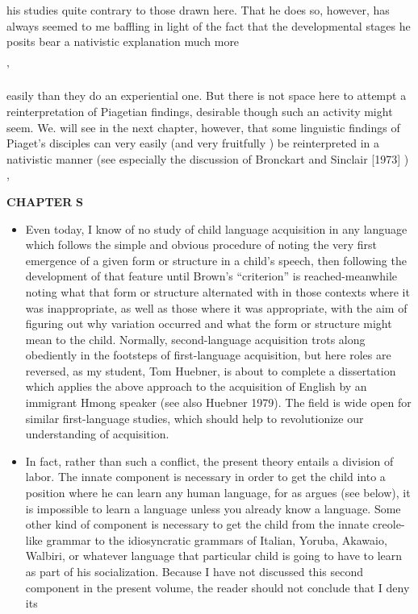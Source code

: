 his studies quite contrary to those drawn here. That he does so, how\-ever, has always seemed to me baffling in light of the fact that the developmental stages he posits bear a nativistic explanation much more

'


easily than they do an experiential one. But there is not space here to attempt a reinterpretation of Piagetian findings, desirable though such an activity might seem. We. will see in the next chapter, however, that some linguistic findings of Piaget's disciples can very easily (and very fruitfully ) be reinterpreted in a nativistic manner (see especially the discussion of Bronckart and Sinclair [1973] ) ,

\textbf{CHAPTER} \textbf{S}

\begin{itemize}
\item Even today, I know of no study of child language acquisition in any language which follows the simple and obvious procedure of noting the very first emergence of a given form or structure in a child's speech, then following the development of that feature until Brown's ``criterion'' is reached-meanwhile noting what that form or structure alternated with in those contexts where it was inappropriate, as well as those where it was appropriate, with the aim of figuring out why variation occurred and what the form or structure might mean to the child. Normally, second-language acquisition trots along obediently in the footsteps of first-language acquisition, but here roles are reversed, as my student, Tom Huebner, is about to complete a dissertation which applies the above approach to the acquisition of English by an immi\-grant Hmong speaker (see also Huebner 1979). The field is wide open for similar first-language studies, which should help to revolutionize our understanding of acquisition.
\item In fact, rather than such a conflict, the present theory entails a division of labor. The innate component is necessary in order to get the child into a position where he can learn any human language, for as \citet{Fodor1975} argues (see below), it is impossible to learn a language unless you already know a language. Some other kind of component is necessary to get the child from the innate creole-like grammar to the idiosyncratic grammars of Italian, Yoruba, Akawaio, Walbiri, or what\-ever language that particular child is going to have to learn as part of his socialization. Because I have not discussed this second component in the present volume, the reader should not conclude that I deny its
\end{itemize}

